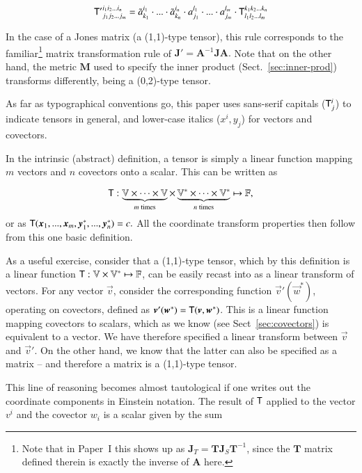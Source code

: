 \documentclass[]{aa}
\begin{document}
\begin{equation}
  \label{eq:tensor-coord-xform}
\mathsf{T'}_{j_1j_2...j_m}^{i_1i_2...i_n} = 
\tilde a^{i_1}_{k_1}\cdot...\cdot\tilde a^{i_n}_{k_n} \cdot 
a_{j_1}^{l_1}\cdot...\cdot a_{j_m}^{l_m} \cdot
\mathsf{T}_{l_1l_2...l_m}^{k_1k_2...k_n} 
\end{equation}

In the case of a Jones matrix (a (1,1)-type tensor), this rule corresponds to the familiar\footnote{Note that in Paper~I \citep[Sect.~6.3]{RRIME1} this shows up as $\mathbf{J}_T=\mathbf{T}\mathbf{J}_S\mathbf{T}^{-1}$, since the $\mathbf{T}$ matrix defined therein is exactly the inverse of $\mathbf{A}$ here.} matrix transformation rule of $\mathbf{J}'=\mathbf{A}^{-1}\mathbf{J}\mathbf{A}.$ Note that on the other hand, the metric $\mathbf{M}$ used to specify the inner product (Sect.~\ref{sec:inner-prod}) transforms differently, being a (0,2)-type tensor.

As far as typographical conventions go, this paper uses sans-serif capitals ($\mathsf{T}_j^i$) to indicate tensors in general, and lower-case italics ($x^i, y_j$) for vectors and covectors.

In the intrinsic (abstract) definition, a tensor is simply a linear function mapping $m$ vectors and $n$ covectors onto a scalar. This can be written as

\[
  \mathsf{T}: \underbrace{\mathbb{V}\times\cdots\times\mathbb{V}}_{m\;\mathrm{times}}\times
  \underbrace{\mathbb{V}^*\times\cdots\times\mathbb{V}^*}_{n\;\mathrm{times}} \mapsto \mathbb{F},
\]
or as $\tens{T}(\vec x_1,...,\vec x_m,\vec y^*_1,...,\vec y^*_n)=c.$ All the coordinate transform properties then follow from this one basic definition.

As a useful exercise, consider that a (1,1)-type tensor, which by this definition is a linear function $\mathsf{T}:\mathbb{V}\times\mathbb{V}^* \mapsto \mathbb{F}$, can be easily recast into as a linear transform of vectors. For any vector $\vec v$, consider the corresponding function $\vec v'(\vec w^*)$, operating on covectors, defined as $\vec v'(\vec w^*)= \tens{T}(\vec v,\vec w^*)$. This is a linear function mapping covectors to scalars, which as we know (see Sect~\ref{sec:covectors}) is equivalent to a vector. We have therefore specified a linear transform between $\vec v$ and $\vec v'$. On the other hand, we know that the latter can also be specified as a matrix -- and therefore a matrix is a (1,1)-type tensor. 

This line of reasoning becomes almost tautological if one writes out the coordinate components in Einstein notation. The result of $\mathsf{T}$ applied to the vector $v^i$ and the covector $w_i$ is a scalar given by the sum
\end{document}
